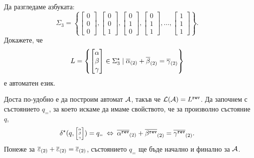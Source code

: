 \begin{extra}
\begin{problem}
  Да разгледаме азбуката:
  \[\Sigma_3 = \left\{\begin{bmatrix} 0\\0\\0\end{bmatrix},\begin{bmatrix} 0\\0\\1\end{bmatrix},\begin{bmatrix} 0\\1\\0\end{bmatrix},\begin{bmatrix} 0\\1\\1\end{bmatrix},\dots,\begin{bmatrix} 1\\1\\1\end{bmatrix}\right\}.\]
  Докажете, че 
  \[L = \left\{\begin{bmatrix} \alpha\\\beta\\\gamma\end{bmatrix} \in \Sigma^\star_3 \mid \overline{\alpha}_{(2)}+\overline{\beta}_{(2)} = \overline{\gamma}_{(2)}\right\}\]
  е автоматен език.
\end{problem}
\ifhints
\begin{hint}
  Доста по-удобно е да построим автомат $\mathcal{A}$, такъв че $\mathcal{L}(\mathcal{A}) = L^{\texttt{rev}}$.
  Да започнем с състоянието $q_{\scriptscriptstyle{=}}$, за което искаме да имаме свойството, че за произволно състояние $q$,
  \[\delta^\star(q, \tiny{ \begin{bmatrix} \alpha\\ \beta \\ \gamma\end{bmatrix} }) = q_{\scriptscriptstyle{=}}  \ \Leftrightarrow\  \overline{\alpha^{\texttt{rev}}}_{(2)} + \overline{\beta^{\texttt{rev}}}_{(2)} = \overline{\gamma^{\texttt{rev}}}_{(2)}.\]
  Понеже за $\overline{\varepsilon}_{(2)} + \overline{\varepsilon}_{(2)} = \overline{\varepsilon}_{(2)}$, състоянието $q_{\scriptscriptstyle{=}}$ ще бъде начално и финално за $\mathcal{A}$.


\end{hint}
\end{extra}
